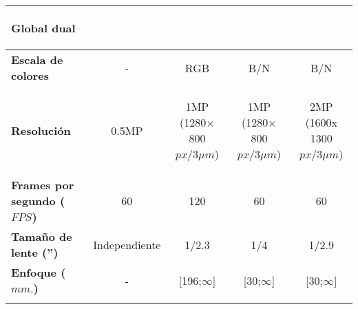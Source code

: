 \begin{itemize}
\begin{savenotes}
\begin{mytable}[H]
\begin{tabular}{l|c|c|c|c|}
\begin{minipage}{\mythirdmaxsizeofcontenttable}
\begin{myflushcenter}
				Global dual 
			\end{myflushcenter}\end{minipage} \\ \hline
			\multicolumn{1}{|l|}{
				\begin{minipage}{\myforthmaxsizeofcontenttable}	
					\textbf{Escala de colores}
				\end{minipage}
			} & - & RGB & B/N & B/N \\ \hline
			\multicolumn{1}{|l|}{
				\begin{minipage}{\myforthmaxsizeofcontenttable}	
					\textbf{Resolución}
				\end{minipage}
			} & 0.5MP & 
			\begin{minipage}{\mythirdmaxsizeofcontenttable}\begin{myflushcenter}
					1MP (1280× 800 $px/3{\mu}m$)
			\end{myflushcenter}\end{minipage} & 
			\begin{minipage}{\mythirdmaxsizeofcontenttable}\begin{myflushcenter}
					1MP (1280× 800 $px/3{\mu}m$)
			\end{myflushcenter}\end{minipage} & 
			\begin{minipage}{\mythirdmaxsizeofcontenttable}\begin{myflushcenter}
					2MP (1600x 1300 $px/3{\mu}m$)
			\end{myflushcenter}\end{minipage} \\ \hline
			\multicolumn{1}{|l|}{
				\begin{minipage}{\myforthmaxsizeofcontenttable}	
					\textbf{Frames por segundo ($FPS$)}
				\end{minipage}
			} & 60 %
			& 120 & 60 & 60 \\ \hline
			\multicolumn{1}{|l|}{
				\begin{minipage}{\myforthmaxsizeofcontenttable}	
					\textbf{Tamaño de lente ('')}
				\end{minipage}
			} & Independiente & 1/2.3 & 1/4 & 1/2.9 \\ \hline
			\multicolumn{1}{|l|}{
				\begin{minipage}{\myforthmaxsizeofcontenttable}	
					\textbf{Enfoque ($mm.$)}
				\end{minipage}
			} & - & [196;$\infty$] & [30;$\infty$] & [30;$\infty$] \\ \hline
			\multicolumn{1}{|l|}{
}
\end{tabular}
\end{mytable}
\end{savenotes}
\end{itemize}
